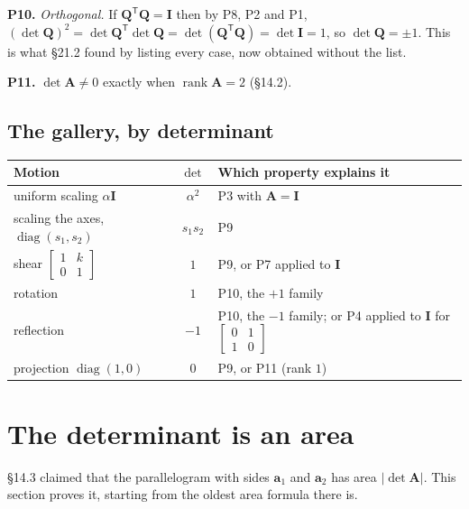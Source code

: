 \documentclass[11pt]{article}
\theoremstyle{plain}
\theoremstyle{definition}
\theoremstyle{remark}
\newcommand{\vc}[1]{\mathbf{#1}}
\newcommand{\mt}[1]{\mathbf{#1}}
\newcommand{\T}{^{\mathsf{T}}}
\newcommand{\smat}[1]{\left[\begin{smallmatrix}#1\end{smallmatrix}\right]}
\DeclareMathOperator{\diagop}{diag}
\DeclareMathOperator{\rank}{rank}
\begin{document}
\textbf{P10.} \emph{Orthogonal.} If $\mt{Q}\T\mt{Q}=\mt{I}$ then by P8, P2 and
P1, $(\det\mt{Q})^{2}=\det\mt{Q}\T\det\mt{Q}=\det(\mt{Q}\T\mt{Q})=\det\mt{I}=1$,
so $\det\mt{Q}=\pm1$. This is what \S21.2 found by listing every case, now
obtained without the list.

\textbf{P11.} $\det\mt{A}\neq0$ exactly when $\rank\mt{A}=2$ (\S14.2).

\subsection{The gallery, by determinant}
\begin{center}
\renewcommand{\arraystretch}{1.4}
\begin{tabular}{@{}l c l@{}}
\toprule
\textbf{Motion} & $\det$ & \textbf{Which property explains it} \\
\midrule
uniform scaling $\alpha\mt{I}$ & $\alpha^{2}$ & P3 with $\mt{A}=\mt{I}$ \\
scaling the axes, $\diagop(s_1,s_2)$ & $s_1s_2$ & P9 \\
shear $\smat{1&k\\0&1}$ & $1$ & P9, or P7 applied to $\mt{I}$ \\
rotation & $1$ & P10, the $+1$ family \\
reflection & $-1$ & P10, the $-1$ family; or P4 applied to $\mt{I}$ for $\smat{0&1\\1&0}$ \\
projection $\diagop(1,0)$ & $0$ & P9, or P11 (rank $1$) \\
\bottomrule
\end{tabular}
\end{center}

\section{The determinant is an area}
\S14.3 claimed that the parallelogram with sides $\vc{a}_1$ and $\vc{a}_2$ has
area $|\det\mt{A}|$. This section proves it, starting from the oldest area
formula there is.

\end{document}
